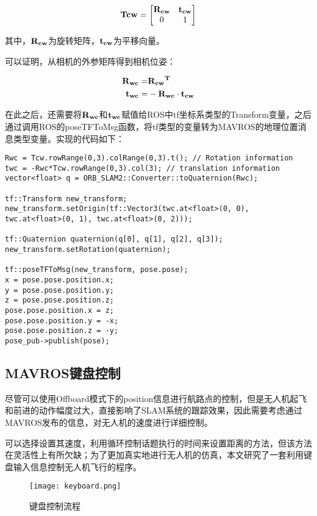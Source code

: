 \begin{equation}
\bf{Tcw}=\begin{bmatrix}
\bf{R_{cw}} & \bf{t_{cw}}\\0 & 1
\end{bmatrix}
\end{equation}

其中，$\bf{R_{cw}}$为旋转矩阵，$\bf{t_{cw}}$为平移向量。

可以证明，从相机的外参矩阵得到相机位姿：

\begin{equation}
\begin{aligned}
\bf{R_{wc}}= &\bf{R_{cw}}^T\\
\bf{t_{wc}}= &-\bf{R_{wc}} \cdot  \bf{t_{cw}}
\end{aligned}
\end{equation}

在此之后，还需要将$\bf{R_{wc}}$和$\bf{t_{wc}}$赋值给ROS中tf坐标系类型的Transform变量，之后通过调用ROS的poseTFToMsg函数，将tf类型的变量转为MAVROS的地理位置消息类型变量。实现的代码如下：

\begin{verbatim}
Rwc = Tcw.rowRange(0,3).colRange(0,3).t(); // Rotation information
twc = -Rwc*Tcw.rowRange(0,3).col(3); // translation information
vector<float> q = ORB_SLAM2::Converter::toQuaternion(Rwc);

tf::Transform new_transform;
new_transform.setOrigin(tf::Vector3(twc.at<float>(0, 0), 
twc.at<float>(0, 1), twc.at<float>(0, 2)));

tf::Quaternion quaternion(q[0], q[1], q[2], q[3]);
new_transform.setRotation(quaternion);

tf::poseTFToMsg(new_transform, pose.pose);
x = pose.pose.position.x;
y = pose.pose.position.y;
z = pose.pose.position.z;
pose.pose.position.x = z;
pose.pose.position.y = -x;
pose.pose.position.z = -y;
pose_pub->publish(pose);
\end{verbatim}

\subsection{MAVROS键盘控制} \label{4.2.4}

尽管可以使用Offboard模式下的position信息进行航路点的控制，但是无人机起飞和前进的动作幅度过大，直接影响了SLAM系统的跟踪效果，因此需要考虑通过MAVROS发布的信息，对无人机的速度进行详细控制。

可以选择设置其速度，利用循环控制话题执行的时间来设置距离的方法，但该方法在灵活性上有所欠缺；为了更加真实地进行无人机的仿真，本文研究了一套利用键盘输入信息控制无人机飞行的程序。
~\\
\begin{figure}[!ht]
	\centering
	\texttt{[image: keyboard.png]}
	\caption{键盘控制流程}
	\label{fig-keyboard}
\end{figure}

